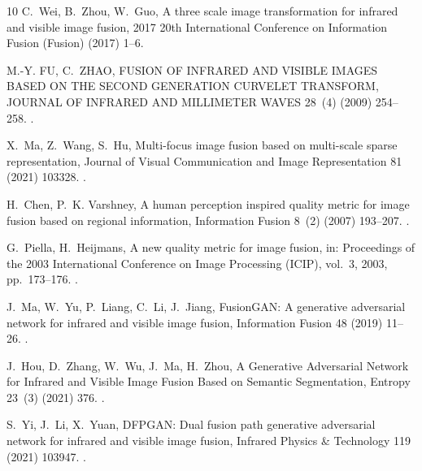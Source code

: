 \begin{thebibliography}{10}
C.~Wei, B.~Zhou, W.~Guo, {A three scale image transformation for infrared and
  visible image fusion}, 2017 20th International Conference on Information
  Fusion (Fusion) (2017) 1--6\newblock \href {https://doi.org/10.23919/icif.2017.8009748}
  {}.

M.-Y. FU, C.~ZHAO, {FUSION OF INFRARED AND VISIBLE IMAGES BASED ON THE SECOND
  GENERATION CURVELET TRANSFORM}, JOURNAL OF INFRARED AND MILLIMETER WAVES
  28~(4) (2009) 254--258.
\newblock \href {https://doi.org/10.3724/sp.j.1010.2009.00254}
  {}.

X.~Ma, Z.~Wang, S.~Hu, {Multi-focus image fusion based on multi-scale sparse
  representation}, Journal of Visual Communication and Image Representation 81
  (2021) 103328.
\newblock \href {https://doi.org/10.1016/j.jvcir.2021.103328}
  {}.

H.~Chen, P.~K. Varshney, {A human perception inspired quality metric for image
  fusion based on regional information}, Information Fusion 8~(2) (2007)
  193--207.
\newblock \href {https://doi.org/10.1016/j.inffus.2005.10.001}
  {}.

G.~Piella, H.~Heijmans, {A new quality metric for image fusion}, in: Proceedings
  of the 2003 International Conference on Image Processing (ICIP), vol.~3, 2003,
  pp.~173--176.
\newblock \href {https://doi.org/10.1109/ICIP.2003.1247209}
  {}.

J.~Ma, W.~Yu, P.~Liang, C.~Li, J.~Jiang, {FusionGAN: A generative adversarial
  network for infrared and visible image fusion}, Information Fusion 48 (2019)
  11--26.
\newblock \href {https://doi.org/10.1016/j.inffus.2018.09.004}
  {}.

J.~Hou, D.~Zhang, W.~Wu, J.~Ma, H.~Zhou, {A Generative Adversarial Network for
  Infrared and Visible Image Fusion Based on Semantic Segmentation}, Entropy
  23~(3) (2021) 376.
\newblock \href {https://doi.org/10.3390/e23030376}
  {}.

S.~Yi, J.~Li, X.~Yuan, {DFPGAN: Dual fusion path generative adversarial network
  for infrared and visible image fusion}, Infrared Physics \& Technology 119
  (2021) 103947.
\newblock \href {https://doi.org/10.1016/j.infrared.2021.103947}
  {}.


\end{thebibliography}
